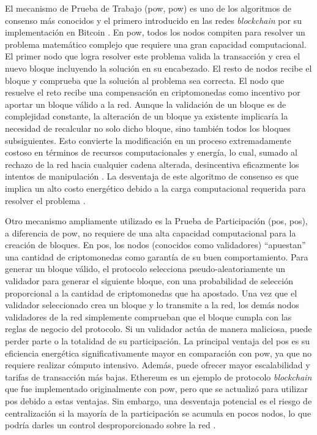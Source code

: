 El mecanismo de Prueba de Trabajo (\acrshort{pow}, \acrlong{pow}) es uno de los algoritmos de consenso más conocidos y el primero introducido en las redes \textit{blockchain} por su implementación en Bitcoin \cite{satoshi2008bitcoin}. En \acrshort{pow}, todos los nodos compiten para resolver un problema matemático complejo que requiere una gran capacidad computacional. El primer nodo que logra resolver este problema valida la transacción y crea el nuevo bloque incluyendo la solución en su encabezado. El resto de nodos recibe el bloque y comprueba que la solución al problema sea correcta. El nodo que resuelve el reto recibe una compensación en \glspl{criptomoneda} como incentivo por aportar un bloque válido a la red. Aunque la validación de un bloque es de complejidad constante, la alteración de un bloque ya existente implicaría la necesidad de recalcular no solo dicho bloque, sino también todos los bloques subsiguientes. Esto convierte la modificación en un proceso extremadamente costoso en términos de recursos computacionales y energía, lo cual, sumado al rechazo de la red hacia cualquier cadena alterada, desincentiva eficazmente los intentos de manipulación \cite{satoshi2008bitcoin}. La desventaja de este algoritmo de consenso es que implica un alto costo energético debido a la carga computacional requerida para resolver el problema \cite{diez2023web}.

Otro mecanismo ampliamente utilizado es la Prueba de Participación (\acrshort{pos}, \acrlong{pos}), a diferencia de \acrshort{pow}, no requiere de una alta capacidad computacional para la creación de bloques. En \acrshort{pos}, los \glspl{nodo} (conocidos como validadores) ``apuestan'' una cantidad de \glspl{criptomoneda} como garantía de su buen comportamiento. Para generar un bloque válido, el protocolo selecciona pseudo-aleatoriamente un validador para generar el siguiente bloque, con una probabilidad de selección proporcional a la cantidad de criptomonedas que ha apostado. Una vez que el validador seleccionado crea un bloque y lo transmite a la red, los demás nodos validadores de la red simplemente comprueban que el bloque cumpla con las reglas de negocio del protocolo. Si un validador actúa de manera maliciosa, puede perder parte o la totalidad de su participación. La principal ventaja del \acrshort{pos} es su eficiencia energética significativamente mayor en comparación con \acrshort{pow}, ya que no requiere realizar cómputo intensivo. Además, puede ofrecer mayor escalabilidad y tarifas de transacción más bajas. Ethereum es un ejemplo de protocolo \textit{blockchain} que fue implementado originalmente con \acrshort{pow}, pero que se actualizó para utilizar \acrshort{pos} debido a estas ventajas. Sin embargo, una desventaja potencial es el riesgo de centralización si la mayoría de la participación se acumula en pocos nodos, lo que podría darles un control desproporcionado sobre la red \cite{tripathi2023comprehensive}.

